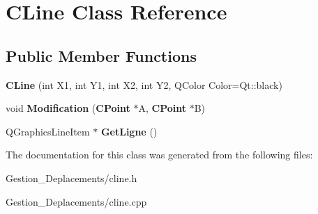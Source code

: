 \section{C\-Line Class Reference}
\label{class_c_line}
\subsection*{Public Member Functions}
\begin{DoxyCompactItemize}
\item 
{\bfseries C\-Line} (int X1, int Y1, int X2, int Y2, Q\-Color Color=Qt\-::black)\label{class_c_line_a8bb77e5abae581bd6b3184404abb934c}

\item 
void {\bfseries Modification} ({\bf C\-Point} $\ast$A, {\bf C\-Point} $\ast$B)\label{class_c_line_a3d754a7be52bda68961b13966a19e5c5}

\item 
Q\-Graphics\-Line\-Item $\ast$ {\bfseries Get\-Ligne} ()\label{class_c_line_a39daab537e8aaf83f85d08cec2aecc54}

\end{DoxyCompactItemize}


The documentation for this class was generated from the following files\-:\begin{DoxyCompactItemize}
\item 
Gestion\-\_\-\-Deplacements/cline.\-h\item 
Gestion\-\_\-\-Deplacements/cline.\-cpp\end{DoxyCompactItemize}
